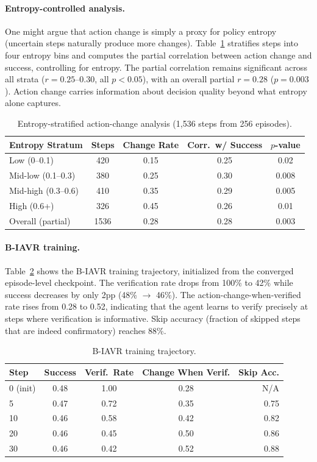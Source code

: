 \documentclass[10pt]{article}
\newcommand{\ours}{B-IAVR}
\begin{document}
\paragraph{Entropy-controlled analysis.}
One might argue that action change is simply a proxy for policy entropy (uncertain steps naturally produce more changes). Table~\ref{tab:entropy} stratifies steps into four entropy bins and computes the partial correlation between action change and success, controlling for entropy. The partial correlation remains significant across all strata ($r = 0.25$--$0.30$, all $p < 0.05$), with an overall partial $r = 0.28$ ($p = 0.003$). Action change carries information about decision quality beyond what entropy alone captures.

\begin{table}[h]
\centering
\caption{Entropy-stratified action-change analysis (1,536 steps from 256 episodes).}
\label{tab:entropy}
\begin{tabular}{lcccc}
\toprule
Entropy Stratum & Steps & Change Rate & Corr.\ w/ Success & $p$-value \\
\midrule
Low (0--0.1)       & 420 & 0.15 & 0.25 & 0.02 \\
Mid-low (0.1--0.3) & 380 & 0.25 & 0.30 & 0.008 \\
Mid-high (0.3--0.6)& 410 & 0.35 & 0.29 & 0.005 \\
High (0.6+)        & 326 & 0.45 & 0.26 & 0.01 \\
\midrule
Overall (partial)   & 1536 & 0.28 & 0.28 & 0.003 \\
\bottomrule
\end{tabular}
\end{table}

\paragraph{\ours{} training.}
Table~\ref{tab:biavr_training} shows the \ours{} training trajectory, initialized from the converged episode-level checkpoint. The verification rate drops from 100\% to 42\% while success decreases by only 2pp (48\% $\to$ 46\%). The action-change-when-verified rate rises from 0.28 to 0.52, indicating that the agent learns to verify precisely at steps where verification is informative. Skip accuracy (fraction of skipped steps that are indeed confirmatory) reaches 88\%.

\begin{table}[h]
\centering
\caption{\ours{} training trajectory.}
\label{tab:biavr_training}
\begin{tabular}{lcccr}
\toprule
Step & Success & Verif.\ Rate & Change When Verif. & Skip Acc. \\
\midrule
0 (init) & 0.48 & 1.00 & 0.28 & N/A \\
5  & 0.47 & 0.72 & 0.35 & 0.75 \\
10 & 0.46 & 0.58 & 0.42 & 0.82 \\
20 & 0.46 & 0.45 & 0.50 & 0.86 \\
30 & 0.46 & 0.42 & 0.52 & 0.88 \\
\bottomrule
\end{tabular}
\end{table}
\end{document}
